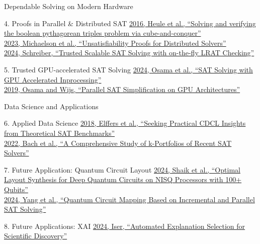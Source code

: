 \documentclass[de]{sdqbeamer}
\begin{document}
\begin{frame}{Dependable Solving on Modern Hardware}
	\begin{exampleblock}{4. Proofs in Parallel \& Distributed SAT}
		\href{https://doi.org/10.1007/978-3-319-40970-2\_15}{2016, Heule et al., “Solving and verifying the boolean pythagorean triples problem via cube-and-conquer”}\\
		\href{https://doi.org/10.1007/978-3-031-30823-9\_18}{2023, Michaelson et al., “Unsatisfiability Proofs for Distributed Solvers”}\\
		\href{https://doi.org/10.4230/LIPIcs.SAT.2024.25}{2024, Schreiber, “Trusted Scalable SAT Solving with on-the-fly LRAT Checking”}
	\end{exampleblock}
	\begin{exampleblock}{5. Trusted GPU-accelerated SAT Solving}
		\href{https://doi.org/10.1007/s10703-023-00432-z}{2024, Osama et al., “SAT Solving with GPU Accelerated Inprocessing”}\\
		\href{https://doi.org/10.1007/978-3-030-17462-0\_2}{2019, Osama and Wijs, “Parallel SAT Simplification on GPU Architectures”}
	\end{exampleblock}
\end{frame}

\begin{frame}{Data Science and Applications}
	\begin{exampleblock}{6. Applied Data Science}
		\href{https://doi.org/10.24963/ijcai.2018/181}{2018, Elffers et al., “Seeking Practical CDCL Insights from Theoretical SAT Benchmarks”}\\
		\href{https://doi.org/10.4230/LIPIcs.SAT.2022.2}{2022, Bach et al., “A Comprehensive Study of k-Portfolios of Recent SAT Solvers”}
	\end{exampleblock}
	\begin{exampleblock}{7. Future Application: Quantum Circuit Layout}
		\href{https://doi.org/10.4230/LIPIcs.SAT.2024.26}{2024, Shaik et al., “Optimal Layout Synthesis for Deep Quantum Circuits on NISQ Processors with 100+ Qubits”}\\
		\href{https://doi.org/10.4230/LIPIcs.SAT.2024.29}{2024, Yang et al., “Quantum Circuit Mapping Based on Incremental and Parallel SAT Solving”}
	\end{exampleblock}
	\begin{exampleblock}{8. Future Applications: XAI}
		\href{https://doi.org/10.48550/arXiv.2407.17454}{2024, Iser, “Automated Explanation Selection for Scientific Discovery”}
	\end{exampleblock}
\end{frame}
\end{document}
